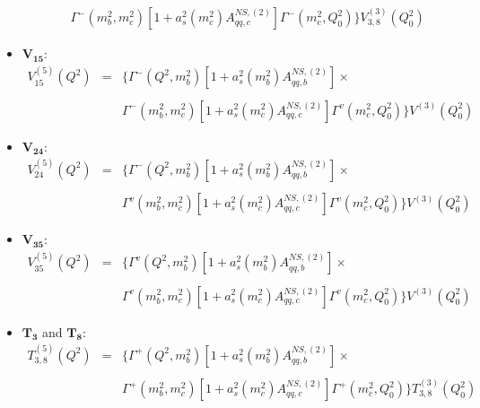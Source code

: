 \documentclass[10pt,a4paper]{article}
\begin{document}
\begin{itemize}
\begin{equation}
\begin{array}{rcl}
\\
& & \displaystyle \Gamma^{-}(m_b^2,m_c^2)[1+a_s^2(m_c^2)A_{qq,c}^{N\!S,(2)}]\Gamma^{-}(m_c^2,Q_0^2)\Big\}V^{(3)}_{3,8}(Q^2_0)
\end{array}
\end{equation}
\item $\mathbf{V_{15}}$:
\begin{equation}
\begin{array}{rcl}
V^{(5)}_{15}(Q^2)&=&\displaystyle \Big\{\Gamma^{-}(Q^2,m_b^2)[1+a_s^2(m_b^2)A_{qq,b}^{N\!S,(2)}]\times\\
\\
& & \displaystyle \Gamma^{-}(m_b^2,m_c^2)[1+a_s^2(m_c^2)A_{qq,c}^{N\!S,(2)}]\Gamma^{v}(m_c^2,Q_0^2)\Big\}V^{(3)}(Q^2_0)
\end{array}
\end{equation}
\item $\mathbf{V_{24}}$:
\begin{equation}
\begin{array}{rcl}
V^{(5)}_{24}(Q^2)&=&\displaystyle \Big\{\Gamma^{-}(Q^2,m_b^2)[1+a_s^2(m_b^2)A_{qq,b}^{N\!S,(2)}]\times\\
\\
& & \displaystyle \Gamma^{v}(m_b^2,m_c^2)[1+a_s^2(m_c^2)A_{qq,c}^{N\!S,(2)}]\Gamma^{v}(m_c^2,Q_0^2)\Big\}V^{(3)}(Q^2_0)
\end{array}
\end{equation}
\item $\mathbf{V_{35}}$:
\begin{equation}
\begin{array}{rcl}
V^{(5)}_{35}(Q^2)&=&\displaystyle \Big\{\Gamma^{v}(Q^2,m_b^2)[1+a_s^2(m_b^2)A_{qq,b}^{N\!S,(2)}]\times\\
\\
& & \displaystyle \Gamma^{v}(m_b^2,m_c^2)[1+a_s^2(m_c^2)A_{qq,c}^{N\!S,(2)}]\Gamma^{v}(m_c^2,Q_0^2)\Big\}V^{(3)}(Q^2_0)
\end{array}
\end{equation}

\item $\mathbf{T_3}$ and $\mathbf{T_8}$:
\begin{equation}
\begin{array}{rcl}
T^{(5)}_{3,8}(Q^2)&=&\displaystyle \Big\{\Gamma^{+}(Q^2,m_b^2)[1+a_s^2(m_b^2)A_{qq,b}^{N\!S,(2)}]\times\\
\\
& & \displaystyle \Gamma^{+}(m_b^2,m_c^2)[1+a_s^2(m_c^2)A_{qq,c}^{N\!S,(2)}]\Gamma^{+}(m_c^2,Q_0^2)\Big\}T^{(3)}_{3,8}(Q^2_0)
\end{array}
\end{equation}


\end{itemize}
\end{document}
